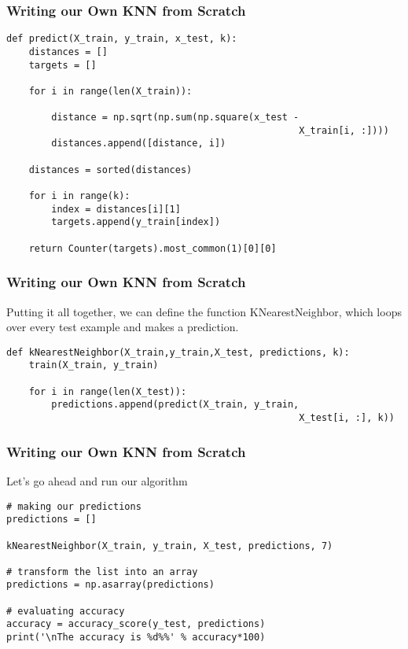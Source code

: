 \begin{frame}[fragile]\frametitle{Writing our Own KNN from Scratch}
\begin{lstlisting}
def predict(X_train, y_train, x_test, k):
	distances = []
	targets = []

	for i in range(len(X_train)):

		distance = np.sqrt(np.sum(np.square(x_test - 
		                                            X_train[i, :])))
		distances.append([distance, i])

	distances = sorted(distances)

	for i in range(k):
		index = distances[i][1]
		targets.append(y_train[index])

	return Counter(targets).most_common(1)[0][0]
\end{lstlisting}
\end{frame}

\begin{frame}[fragile]\frametitle{Writing our Own KNN from Scratch}
Putting it all together, we can define the function KNearestNeighbor, which loops over every test example and makes a prediction.
\begin{lstlisting}
def kNearestNeighbor(X_train,y_train,X_test, predictions, k):
	train(X_train, y_train)

	for i in range(len(X_test)):
		predictions.append(predict(X_train, y_train, 
		                                            X_test[i, :], k))
\end{lstlisting}
\end{frame}

\begin{frame}[fragile]\frametitle{Writing our Own KNN from Scratch}
Let's go ahead and run our algorithm
\begin{lstlisting}
# making our predictions 
predictions = []

kNearestNeighbor(X_train, y_train, X_test, predictions, 7)

# transform the list into an array
predictions = np.asarray(predictions)

# evaluating accuracy
accuracy = accuracy_score(y_test, predictions)
print('\nThe accuracy is %d%%' % accuracy*100)
\end{lstlisting}
\end{frame}


